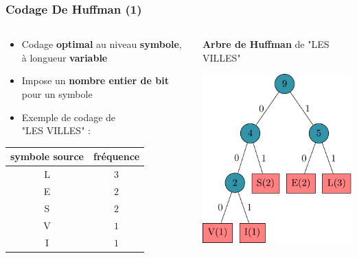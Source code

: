 \documentclass{beamer}
\begin{document}
\begin{frame}
    \frametitle{Codage De Huffman (1)}

    \begin{columns}
        \begin{column}{0.5\textwidth}
            \centering

            \begin{itemize}
                \item Codage \textbf{optimal} au niveau \textbf{symbole}, à longueur \textbf{variable}
                \item Impose un \textbf{nombre entier de bit} pour un symbole
                \item Exemple de codage de \\ "LES VILLES" :
            \end{itemize}

            \vspace*{2em}

            \begin{tabular}{c | c}
                symbole source & fréquence \\
                \hline
                L & $3$ \\
                E & $2$ \\
                S & $2$ \\
                V & $1$ \\
                I & $1$ \\ \hline
            \end{tabular}
        \end{column}

        \begin{column}{0.5\textwidth}
            \textbf{Arbre de Huffman} de "LES VILLES"

            \vspace*{2em}

            \includegraphics{img/huffmanExample/huffmanExample.pdf}
        \end{column}
    \end{columns}
\end{frame}
\end{document}
